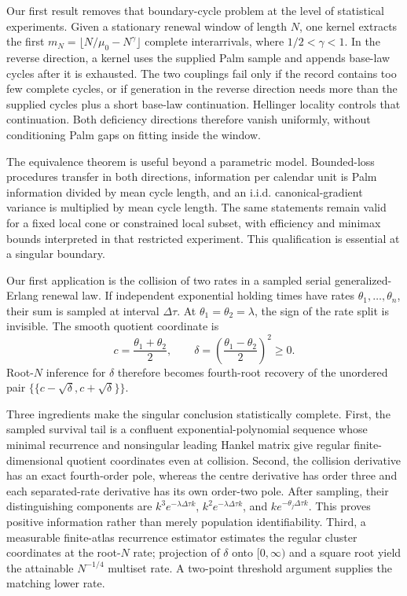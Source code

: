 Our first result removes that boundary-cycle problem at the level of
statistical experiments.  Given a stationary renewal window of length \(N\),
one kernel extracts the first
\(m_N=\lfloor N/\mu_0-N^\gamma\rfloor\) complete interarrivals, where
\(1/2<\gamma<1\).  In the reverse direction, a kernel uses the supplied Palm
sample and appends base-law cycles after it is exhausted.  The two couplings
fail only if the record contains too few complete cycles, or if generation in
the reverse direction needs more than the supplied cycles plus a short
base-law continuation.  Hellinger locality controls that continuation.  Both
deficiency directions therefore vanish uniformly, without conditioning Palm
gaps on fitting inside the window.

The equivalence theorem is useful beyond a parametric model.  Bounded-loss
procedures transfer in both directions, information per calendar unit is Palm
information divided by mean cycle length, and an i.i.d. canonical-gradient
variance is multiplied by mean cycle length.  The same statements remain
valid for a fixed local cone or constrained local subset, with efficiency and
minimax bounds interpreted in that restricted experiment.  This qualification
is essential at a singular boundary.

Our first application is the collision of two rates in a sampled serial
generalized-Erlang renewal law.  If independent exponential holding times have
rates \(\theta_1,\ldots,\theta_n\), their sum is sampled at interval
\(\Delta\tau\).  At \(\theta_1=\theta_2=\lambda\), the sign of the rate split
is invisible.  The smooth quotient coordinate is
\[
 c=\frac{\theta_1+\theta_2}{2},\qquad
 \delta=\left(\frac{\theta_1-\theta_2}{2}\right)^2\ge0.
\]
Root-\(N\) inference for \(\delta\) therefore becomes fourth-root recovery of
the unordered pair \(\{\!\{c-\sqrt\delta,c+\sqrt\delta\}\!\}\).

Three ingredients make the singular conclusion statistically complete.
First, the sampled survival tail is a confluent exponential-polynomial
sequence whose minimal recurrence and nonsingular leading Hankel matrix give
regular finite-dimensional quotient coordinates even at collision.  Second,
the collision derivative has an exact fourth-order pole, whereas the centre
derivative has order three and each separated-rate derivative has its own
order-two pole.  After sampling, their distinguishing components are
\(k^3e^{-\lambda\Delta\tau k}\),
\(k^2e^{-\lambda\Delta\tau k}\), and
\(ke^{-\theta_j\Delta\tau k}\).  This proves positive information rather
than merely population identifiability.  Third, a measurable finite-atlas
recurrence estimator estimates the regular cluster coordinates at the
root-\(N\) rate; projection of \(\delta\) onto \([0,\infty)\) and a square
root yield the attainable \(N^{-1/4}\) multiset rate.  A two-point threshold
argument supplies the matching lower rate.

